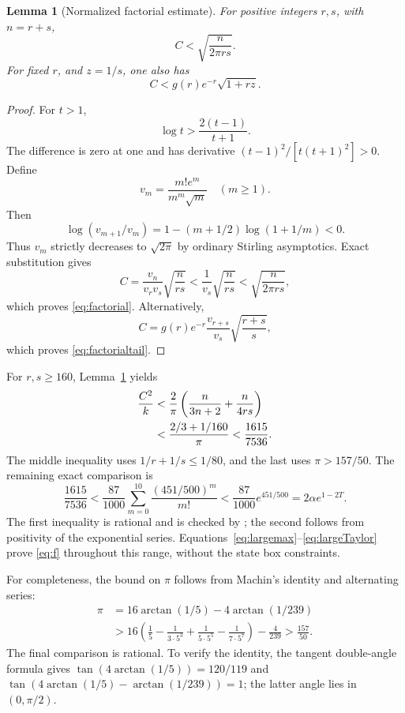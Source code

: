 \documentclass[11pt]{article}
\newtheorem{lemma}[theorem]{Lemma}
\theoremstyle{remark}
\newcommand{\code}[1]{\texttt{\detokenize{#1}}}
\begin{document}
\begin{lemma}[Normalized factorial estimate]\label{lem:factorial}
For positive integers $r,s$, with $n=r+s$,
\begin{equation}\label{eq:factorial}
 C<\sqrt{\frac{n}{2\pi rs}}.
\end{equation}
For fixed $r$, and $z=1/s$, one also has
\begin{equation}\label{eq:factorialtail}
 C<g(r)e^{-r}\sqrt{1+rz}.
\end{equation}
\end{lemma}
\begin{proof}
For $t>1$,
\begin{equation}\label{eq:loglower}
 \log t>\frac{2(t-1)}{t+1}.
\end{equation}
The difference is zero at one and has derivative $(t-1)^2/[t(t+1)^2]>0$. Define
\[
 v_m=\frac{m!e^m}{m^m\sqrt m}\quad(m\ge1).
\]
Then
\[
 \log(v_{m+1}/v_m)=1-(m+1/2)\log(1+1/m)<0.
\]
Thus $v_m$ strictly decreases to $\sqrt{2\pi}$ by ordinary Stirling asymptotics. Exact substitution gives
\[
 C=\frac{v_n}{v_rv_s}\sqrt{\frac n{rs}}
 <\frac1{v_s}\sqrt{\frac n{rs}}
 <\sqrt{\frac n{2\pi rs}},
\]
which proves \eqref{eq:factorial}. Alternatively,
\[
 C=g(r)e^{-r}\frac{v_{r+s}}{v_s}\sqrt{\frac{r+s}{s}},
\]
which proves \eqref{eq:factorialtail}.
\end{proof}

For $r,s\ge160$, Lemma~\ref{lem:factorial} yields
\begin{align}\label{eq:largeconstant}
 \frac{C^2}{k}
 &<\frac2\pi\left(\frac{n}{3n+2}+\frac{n}{4rs}\right)\notag\\
 &<\frac{2/3+1/160}{\pi}<\frac{1615}{7536}.
\end{align}
The middle inequality uses $1/r+1/s\le1/80$, and the last uses $\pi>157/50$. The remaining exact comparison is
\begin{equation}\label{eq:largeTaylor}
 \frac{1615}{7536}
 <\frac{87}{1000}\sum_{m=0}^{10}\frac{(451/500)^m}{m!}
 <\frac{87}{1000}e^{451/500}=2\alpha e^{1-2T}.
\end{equation}
The first inequality is rational and is checked by \code{check_mixed_large_dimensions.py}; the second follows from positivity of the exponential series. Equations~\eqref{eq:largemax}--\eqref{eq:largeTaylor} prove \eqref{eq:f} throughout this range, without the state box constraints.

For completeness, the bound on $\pi$ follows from Machin's identity and alternating series:
\begin{align*}
 \pi&=16\arctan(1/5)-4\arctan(1/239)\\
 &>16\left(\frac15-\frac1{3\cdot5^3}+\frac1{5\cdot5^5}-\frac1{7\cdot5^7}\right)-\frac4{239}
 >\frac{157}{50}.
\end{align*}
The final comparison is rational. To verify the identity, the tangent double-angle formula gives $\tan(4\arctan(1/5))=120/119$ and
$\tan(4\arctan(1/5)-\arctan(1/239))=1$; the latter angle lies in $(0,\pi/2)$.
\end{document}
